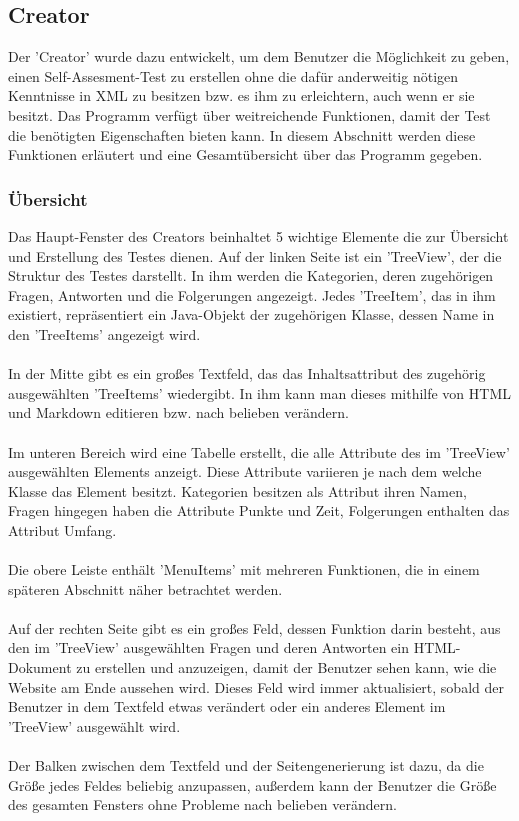 \label{Julian}
\subsection{Creator}
Der 'Creator' wurde dazu entwickelt, um dem Benutzer die Möglichkeit zu geben, einen Self-Assesment-Test zu erstellen ohne die dafür anderweitig nötigen Kenntnisse in XML zu besitzen bzw. es ihm zu erleichtern, auch wenn er sie besitzt. Das Programm verfügt über weitreichende Funktionen, damit der Test die benötigten Eigenschaften bieten kann. In diesem Abschnitt werden diese Funktionen erläutert und eine Gesamtübersicht über das Programm gegeben. 

\subsubsection*{Übersicht}
Das Haupt-Fenster des Creators beinhaltet 5 wichtige Elemente die zur Übersicht und Erstellung des Testes dienen. Auf der linken Seite ist ein 'TreeView', der die Struktur des Testes darstellt. In ihm werden die Kategorien, deren zugehörigen Fragen, Antworten und die Folgerungen angezeigt. Jedes 'TreeItem', das in ihm existiert, repräsentiert ein Java-Objekt der zugehörigen Klasse, dessen Name in den 'TreeItems' angezeigt wird.
\\
\\
In der Mitte gibt es ein großes Textfeld, das das Inhaltsattribut des zugehörig ausgewählten 'TreeItems' wiedergibt. In ihm kann man dieses mithilfe von HTML und Markdown editieren bzw. nach belieben verändern.
\\
\\
Im unteren Bereich wird eine Tabelle erstellt, die alle Attribute des im 'TreeView'  ausgewählten Elements anzeigt. Diese Attribute variieren je nach dem welche Klasse das Element besitzt. Kategorien besitzen als Attribut ihren Namen, Fragen hingegen haben die Attribute Punkte und Zeit, Folgerungen enthalten das Attribut Umfang.
\\
\\
Die obere Leiste enthält 'MenuItems' mit mehreren Funktionen, die in einem späteren Abschnitt näher betrachtet werden.
\\
\\
Auf der rechten Seite gibt es ein großes Feld, dessen Funktion darin besteht, aus den im 'TreeView' ausgewählten Fragen und deren Antworten ein HTML-Dokument zu erstellen und anzuzeigen, damit der Benutzer sehen kann, wie die Website am Ende aussehen wird. Dieses Feld wird immer aktualisiert, sobald der Benutzer in dem Textfeld etwas verändert oder ein anderes Element im 'TreeView' ausgewählt wird.
\\
\\
Der Balken zwischen dem Textfeld und der Seitengenerierung ist dazu, da die Größe jedes Feldes beliebig anzupassen, außerdem kann der Benutzer die Größe des gesamten Fensters ohne Probleme nach belieben verändern.

